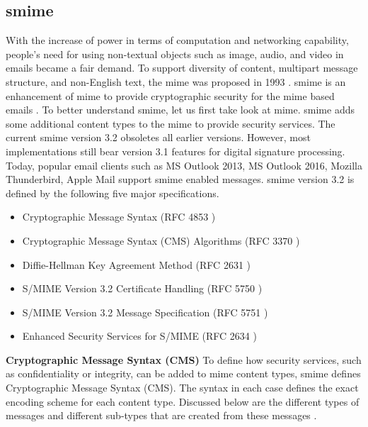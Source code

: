 \subsection{\acrfull{smime}}
\label{chap:analysis-smime}

With the increase of power in terms of computation and networking capability, people's need for using non-textual objects such as image, audio, and video in emails became a fair demand. To support diversity of content, multipart message structure, and non-English text, the \acrfull{mime} was proposed in 1993 \cite{rfc1521}. \acrfull{smime} is an enhancement of \acrshort{mime} to provide cryptographic security for the \acrshort{mime} based emails \cite{rfc1521}. To better understand \acrshort{smime}, let us first take look at \acrshort{mime}.
\acrshort{smime} adds some additional content types to the \acrshort{mime} to provide security services. The current \acrshort{smime} version 3.2 obsoletes all earlier versions. However, most implementations still bear version 3.1 features for digital signature processing. Today, popular email clients such as MS Outlook 2013, MS Outlook 2016, Mozilla Thunderbird, Apple Mail support \acrshort{smime} enabled messages.
\acrshort{smime} version 3.2 is defined by the following five major specifications.
\begin{itemize}
\item Cryptographic Message Syntax (RFC 4853 \cite{rfc4853})
\item Cryptographic Message Syntax (CMS) Algorithms (RFC 3370 \cite{rfc3370})
\item Diffie-Hellman Key Agreement Method (RFC 2631 \cite{rfc2631})
\item S/MIME Version 3.2 Certificate Handling (RFC 5750 \cite{rfc5750})
\item S/MIME Version 3.2 Message Specification (RFC 5751 \cite{rfc5751})
\item Enhanced Security Services for S/MIME (RFC 2634 \cite{rfc2634})
\end{itemize}
\textbf{Cryptographic Message Syntax (CMS)}
\newline
To define how security services, such as confidentiality or integrity, can be added to \acrshort{mime} content types, \acrshort{smime} defines Cryptographic Message Syntax (CMS). The syntax in each case defines the exact encoding scheme for each content type. Discussed below are the different types of messages and different sub-types that are created from these messages \cite{PKCS-7}.
